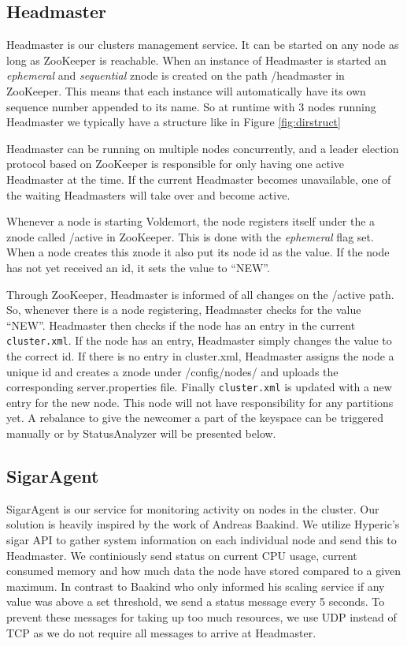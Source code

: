 \subsection{Headmaster}

Headmaster is our clusters management service. It can be started on any node as long as ZooKeeper is reachable. When an instance of Headmaster is started an \emph{ephemeral} and \emph{sequential} znode is created on the path /headmaster in ZooKeeper. This means that each instance will automatically have its own sequence number appended to its name. So at runtime with 3 nodes running Headmaster we typically have a structure like in Figure \ref{fig:dirstruct}

Headmaster can be running on multiple nodes concurrently, and a leader election protocol based on ZooKeeper is responsible for only having one active Headmaster at the time. If the current Headmaster becomes unavailable, one of the waiting Headmasters will take over and become active. 

Whenever a node is starting Voldemort, the node registers itself under the a znode called  /active in ZooKeeper. This is done with the \emph{ephemeral} flag set. When a node creates this znode it also put its node id as the value. If the node has not yet received an id, it sets the value to ``NEW''. 

Through ZooKeeper, Headmaster is informed of all changes on the /active path. So, whenever there is a node registering, Headmaster checks for the value ``NEW''. Headmaster then checks if the node has an entry in the current \texttt{cluster.xml}. If the node has an entry, Headmaster simply changes the value to the correct id. If there is no entry in cluster.xml, Headmaster assigns the node a unique id and creates a znode under /config/nodes/ and uploads the corresponding server.properties file. Finally \texttt{cluster.xml} is updated with a new entry for the new node. This node will not have responsibility for any partitions yet. A rebalance to give the newcomer a part of the keyspace can be triggered manually or by StatusAnalyzer will be presented below.

\subsection{SigarAgent}
SigarAgent is our service for monitoring activity on nodes in the cluster. Our solution is heavily inspired by the work of Andreas Baakind\cite{baakind}. We utilize Hyperic's sigar API to gather system information on each individual node and send this to Headmaster. We continiously send status on current CPU usage, current consumed memory and how much data the node have stored compared to a given maximum. In contrast to Baakind who only informed his scaling service if any value was above a set threshold, we send a status message every 5 seconds. To prevent these messages for taking up too much resources, we use UDP instead of TCP as we do not require all messages to arrive at Headmaster. 

